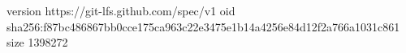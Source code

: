 version https://git-lfs.github.com/spec/v1
oid sha256:f87bc486867bb0cce175ca963c22e3475e1b14a4256e84d12f2a766a1031c861
size 1398272
